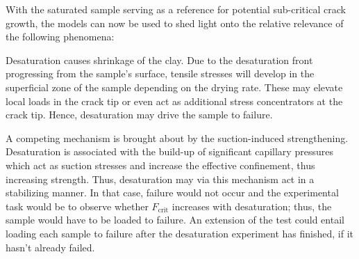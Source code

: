 With the saturated sample serving as a reference for potential sub-critical crack growth, the models can now be used to shed light onto the relative relevance of the following phenomena:
\begin{list}{-}{\leftmargin=1em \itemindent=0em \itemsep=0em}
	\item Desaturation causes shrinkage of the clay. Due to the desaturation front progressing from the sample's surface, tensile stresses will develop in the superficial zone of the sample depending on the drying rate. These may elevate local loads in the crack tip or even act as additional stress concentrators at the crack tip. Hence, desaturation may drive the sample to failure.
	\item A competing mechanism is brought about by the suction-induced strengthening. Desaturation is associated with the build-up of significant capillary pressures which act as suction stresses and increase the effective confinement, thus increasing strength. Thus, desaturation may via this mechanism act in a stabilizing manner. In that case, failure would not occur and the experimental task would be to observe whether $F_\text{crit}$ increases with desaturation; thus, the sample would have to be loaded to failure. An extension of the test could entail loading each sample to failure after the desaturation experiment has finished, if it hasn't already failed.
\end{list}
